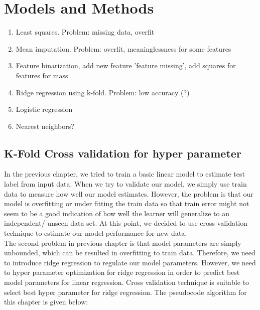 \documentclass[10pt,conference,compsocconf]{IEEEtran}
\begin{document}
\section{Models and Methods}
\begin{enumerate}
\item Least squares. Problem: missing data, overfit
\item Mean imputation. Problem: overfit, meaninglessness for some features
\item Feature binarization, add new feature 'feature missing', add squares for features for mass
\item Ridge regression using k-fold. Problem: low accuracy (?)
\item Logistic regression
\item Nearest neighbors?
\end{enumerate}
\subsection{K-Fold Cross validation for hyper parameter}
In the previous chapter, we tried to train a basic linear model to 
estimate test label from input data. When we try to validate our model, 
we simply use train data to measure how well our model estimates. 
However, the problem is that our model is overfitting or under fitting 
the train data so that train error might not seem to be a good 
indication of how well the learner will generalize to an independent/ 
unseen data set. At this point, we decided to use cross validation 
technique to estimate our model performance for new data.\\ 

The second problem in previous chapter is that model parameters are 
simply unbounded, which can be resulted in overfitting to train data. 
Therefore, we need to introduce ridge regression to regulate our model 
parameters. However, we need to hyper parameter optimization for ridge 
regression in order to predict best model parameters for linear 
regression. Cross validation technique is suitable to select best hyper 
parameter for ridge regression. The pseudocode algorithm for this 
chapter is given below:
\end{document}
